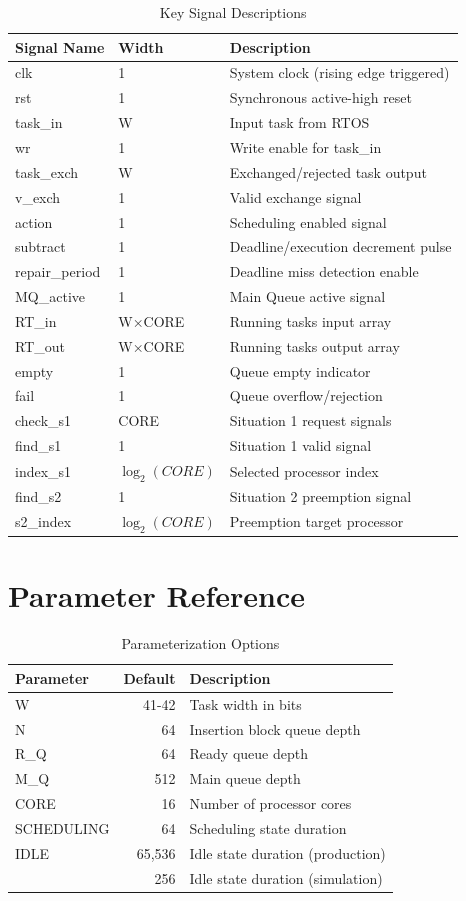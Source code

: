 \documentclass[12pt,a4paper]{article}
\begin{document}
\begin{table}[H]
\centering
\small
\begin{tabular}{|l|l|p{6cm}|}
\hline
\textbf{Signal Name} & \textbf{Width} & \textbf{Description} \\
\hline
clk & 1 & System clock (rising edge triggered) \\
rst & 1 & Synchronous active-high reset \\
task\_in & W & Input task from RTOS \\
wr & 1 & Write enable for task\_in \\
task\_exch & W & Exchanged/rejected task output \\
v\_exch & 1 & Valid exchange signal \\
action & 1 & Scheduling enabled signal \\
subtract & 1 & Deadline/execution decrement pulse \\
repair\_period & 1 & Deadline miss detection enable \\
MQ\_active & 1 & Main Queue active signal \\
RT\_in & W×CORE & Running tasks input array \\
RT\_out & W×CORE & Running tasks output array \\
empty & 1 & Queue empty indicator \\
fail & 1 & Queue overflow/rejection \\
check\_s1 & CORE & Situation 1 request signals \\
find\_s1 & 1 & Situation 1 valid signal \\
index\_s1 & $\log_2(CORE)$ & Selected processor index \\
find\_s2 & 1 & Situation 2 preemption signal \\
s2\_index & $\log_2(CORE)$ & Preemption target processor \\
\hline
\end{tabular}
\caption{Key Signal Descriptions}
\end{table}

\section{Parameter Reference}

\begin{table}[H]
\centering
\begin{tabular}{|l|r|l|}
\hline
\textbf{Parameter} & \textbf{Default} & \textbf{Description} \\
\hline
W & 41-42 & Task width in bits \\
N & 64 & Insertion block queue depth \\
R\_Q & 64 & Ready queue depth \\
M\_Q & 512 & Main queue depth \\
CORE & 16 & Number of processor cores \\
SCHEDULING & 64 & Scheduling state duration \\
IDLE & 65,536 & Idle state duration (production) \\
& 256 & Idle state duration (simulation) \\
\hline
\end{tabular}
\caption{Parameterization Options}
\end{table}
\end{document}
